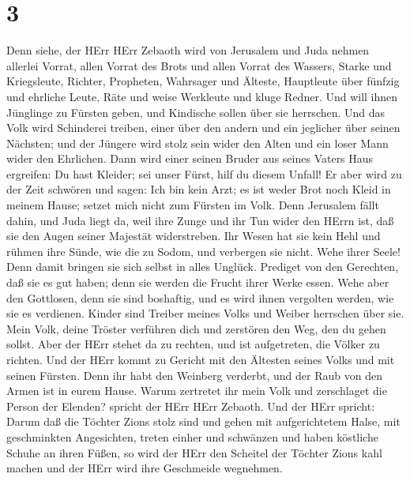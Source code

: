 \hypertarget{section-2}{%
\section{3}\label{section-2}}

 Denn siehe, der HErr HErr Zebaoth wird von Jerusalem und
Juda nehmen allerlei Vorrat, allen Vorrat des Brots und allen Vorrat des
Wassers,  Starke und Kriegsleute, Richter, Propheten,
Wahrsager und Älteste,  Hauptleute über fünfzig und ehrliche
Leute, Räte und weise Werkleute und kluge Redner.  Und will
ihnen Jünglinge zu Fürsten geben, und Kindische sollen über sie
herrschen.  Und das Volk wird Schinderei treiben, einer über
den andern und ein jeglicher über seinen Nächsten; und der Jüngere wird
stolz sein wider den Alten und ein loser Mann wider den Ehrlichen.
 Dann wird einer seinen Bruder aus seines Vaters Haus
ergreifen: Du hast Kleider; sei unser Fürst, hilf du diesem Unfall!
 Er aber wird zu der Zeit schwören und sagen: Ich bin kein
Arzt; es ist weder Brot noch Kleid in meinem Hause; setzet mich nicht
zum Fürsten im Volk.  Denn Jerusalem fällt dahin, und Juda
liegt da, weil ihre Zunge und ihr Tun wider den HErrn ist, daß sie den
Augen seiner Majestät widerstreben.  Ihr Wesen hat sie kein
Hehl und rühmen ihre Sünde, wie die zu Sodom, und verbergen sie nicht.
Wehe ihrer Seele! Denn damit bringen sie sich selbst in alles Unglück.
 Prediget von den Gerechten, daß sie es gut haben; denn sie
werden die Frucht ihrer Werke essen.  Wehe aber den
Gottlosen, denn sie sind boshaftig, und es wird ihnen vergolten werden,
wie sie es verdienen.  Kinder sind Treiber meines Volks und
Weiber herrschen über sie. Mein Volk, deine Tröster verführen dich und
zerstören den Weg, den du gehen sollst.  Aber der HErr
stehet da zu rechten, und ist aufgetreten, die Völker zu richten.
 Und der HErr kommt zu Gericht mit den Ältesten seines
Volks und mit seinen Fürsten. Denn ihr habt den Weinberg verderbt, und
der Raub von den Armen ist in eurem Hause.  Warum zertretet
ihr mein Volk und zerschlaget die Person der Elenden? spricht der HErr
HErr Zebaoth.  Und der HErr spricht: Darum daß die Töchter
Zions stolz sind und gehen mit aufgerichtetem Halse, mit geschminkten
Angesichten, treten einher und schwänzen und haben köstliche Schuhe an
ihren Füßen,  so wird der HErr den Scheitel der Töchter
Zions kahl machen und der HErr wird ihre Geschmeide wegnehmen.
